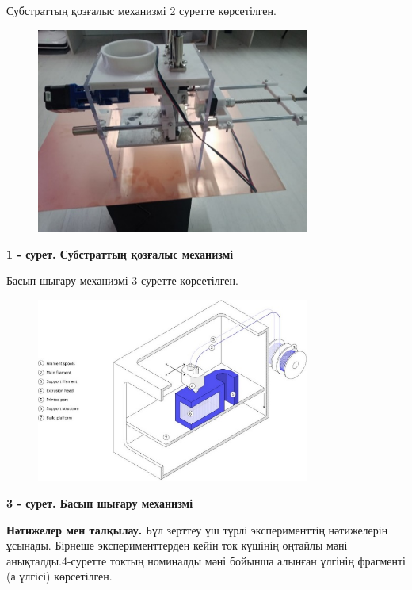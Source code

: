 Субстраттың қозғалыс механизмі 2 суретте көрсетілген.


\begin{figure}[H]
	\centering
	\includegraphics[width=0.8\textwidth]{media/ict2/image188}
	\caption*{}
\end{figure}


{\bfseries 1 - сурет. Субстраттың қозғалыс механизмі}

Басып шығару механизмі 3-суретте көрсетілген.


\begin{figure}[H]
	\centering
	\includegraphics[width=0.8\textwidth]{media/ict2/image189}
	\caption*{}
\end{figure}


{\bfseries 3 - сурет. Басып шығару механизмі}

{\bfseries Нәтижелер мен талқылау.} Бұл зерттеу үш түрлі эксперименттің
нәтижелерін ұсынады. Бірнеше эксперименттерден кейін ток күшінің оңтайлы
мәні анықталды.4-суретте токтың номиналды мәні бойынша алынған үлгінің
фрагменті (а үлгісі) көрсетілген.


